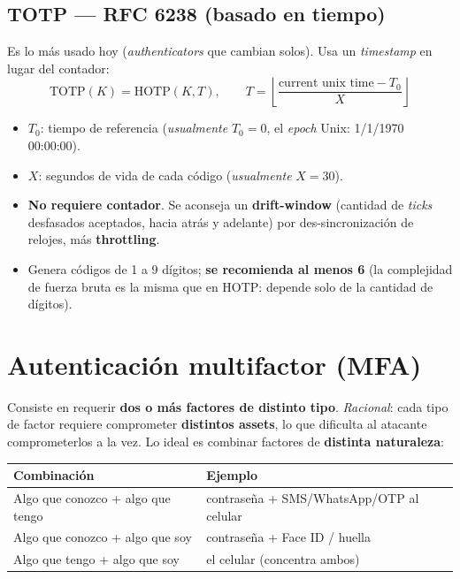 \documentclass[11pt,a4paper]{article}
\begin{document}
\subsection{TOTP — RFC 6238 (basado en tiempo)}
Es lo más usado hoy (\emph{authenticators} que cambian solos). Usa un \emph{timestamp} en
lugar del contador:
\[
  \mathrm{TOTP}(K) = \mathrm{HOTP}(K, T),\qquad
  T = \left\lfloor \frac{\text{current unix time} - T_0}{X} \right\rfloor
\]
\begin{itemize}[leftmargin=1.4em,itemsep=1pt]
  \item $T_0$: tiempo de referencia (\emph{usualmente} $T_0=0$, el \emph{epoch} Unix:
        1/1/1970 00:00:00).
  \item $X$: segundos de vida de cada código (\emph{usualmente} $X=30$).
  \item \textbf{No requiere contador}. Se aconseja un \textbf{drift-window} (cantidad de
        \emph{ticks} desfasados aceptados, hacia atrás y adelante) por des-sincronización de
        relojes, más \textbf{throttling}.
  \item Genera códigos de 1 a 9 dígitos; \textbf{se recomienda al menos 6} (la complejidad de
        fuerza bruta es la misma que en HOTP: depende solo de la cantidad de dígitos).
\end{itemize}

\section{Autenticación multifactor (MFA)}

Consiste en requerir \textbf{dos o más factores de distinto tipo}. \emph{Racional}: cada tipo
de factor requiere comprometer \textbf{distintos assets}, lo que dificulta al atacante
comprometerlos a la vez. Lo ideal es combinar factores de \textbf{distinta naturaleza}:
\begin{center}
\renewcommand{\arraystretch}{1.25}
\begin{tabular}{ll}
\toprule
\textbf{Combinación} & \textbf{Ejemplo} \\
\midrule
Algo que conozco + algo que tengo & contraseña + SMS/WhatsApp/OTP al celular \\
Algo que conozco + algo que soy & contraseña + Face ID / huella \\
Algo que tengo + algo que soy & el celular (concentra ambos) \\
\bottomrule
\end{tabular}
\end{center}
\end{document}
